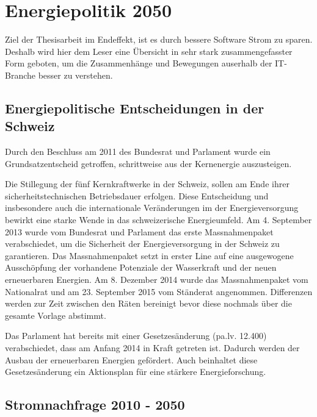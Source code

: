 \chapter{Energiepolitik 2050}


Ziel der Thesisarbeit im Endeffekt, ist es durch bessere Software Strom zu sparen. Deshalb wird hier dem Leser
eine Übersicht in sehr stark zusammengefasster Form geboten, um die Zusammenhänge und Bewegungen auserhalb der
IT-Branche besser zu verstehen.

\section{Energiepolitische Entscheidungen in der Schweiz}
Durch den Beschluss am 2011 des Bundesrat und Parlament wurde ein Grundsatzentscheid getroffen,
schrittweise aus der Kernenergie auszusteigen\cite{bfe_energiestrategie}. 
\par
Die Stillegung der fünf Kernkraftwerke in der Schweiz, sollen am Ende ihrer sicherheitstechnischen
Betriebsdauer erfolgen. Diese Entscheidung und insbesondere auch die internationale Veränderungen 
im der Energieversorgung bewirkt eine starke Wende in das schweizerische Energieumfeld.
Am 4. September 2013 wurde vom Bundesrat und Parlament das erste Massnahmenpaket verabschiedet, um
die Sicherheit der Energieversorgung in der Schweiz zu garantieren. Das Massnahmenpaket setzt in erster
Line auf eine ausgewogene Ausschöpfung der vorhandene Potenziale der Wasserkraft und der neuen erneuerbaren
Energien. Am 8. Dezember 2014 wurde das Massnahmenpaket vom Nationalrat und am 23. September 2015 vom Ständerat
angenommen. Differenzen werden zur Zeit zwischen den Räten bereinigt bevor diese nochmals über die
gesamte Vorlage abstimmt. 
\par
Das Parlament hat bereits mit einer Gesetzesänderung (pa.lv. 12.400) verabschiedet, dass am Anfang 2014 in
Kraft getreten ist. Dadurch werden der Ausbau der erneuerbaren Energien gefördert. Auch beinhaltet
diese Gesetzesänderung ein Aktionsplan für eine stärkere Energieforschung.

\section{Stromnachfrage 2010 - 2050}


